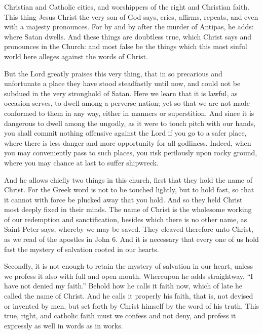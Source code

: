 Christian and Catholic cities, and worshippers of the right and Christian faith. This thing Jesus Christ the very son of God says, cries, affirms, repeats, and even with a majesty pronounces. For by and by after the murder of Antipas, he adds: where Satan dwells. And these things are doubtless true, which Christ says and pronounces in the Church: and most false be the things which this most sinful world here alleges against the words of Christ.

But the Lord greatly praises this very thing, that in so precarious and unfortunate a place they have stood steadfastly until now, and could not be subdued in the very stronghold of Satan. Here we learn that it is lawful, as occasion serves, to dwell among a perverse nation; yet so that we are not made conformed to them in any way, either in manners or superstition. And since it is dangerous to dwell among the ungodly, as it were to touch pitch with our hands, you shall commit nothing offensive against the Lord if you go to a safer place, where there is less danger and more opportunity for all godliness. Indeed, when you may conveniently pass to such places, you risk perilously upon rocky ground, where you may chance at last to suffer shipwreck.

And he allows chiefly two things in this church, first that they hold the name of Christ. For the Greek word is not to be touched lightly, but to hold fast, so that it cannot with force be plucked away that you hold. And so they held Christ most deeply fixed in their minds. The name of Christ is the wholesome working of our redemption and sanctification, besides which there is no other name, as Saint Peter says, whereby we may be saved. They cleaved therefore unto Christ, as we read of the apostles in John 6. And it is necessary that every one of us hold fast the mystery of salvation rooted in our hearts.

Secondly, it is not enough to retain the mystery of salvation in our heart, unless we profess it also with full and open mouth. Whereupon he adds straightway, “I have not denied my faith.” Behold how he calls it faith now, which of late he called the name of Christ. And he calls it properly his faith, that is, not devised or invented by men, but set forth by Christ himself by the word of his truth. This true, right, and catholic faith must we confess and not deny, and profess it expressly as well in words as in works.

